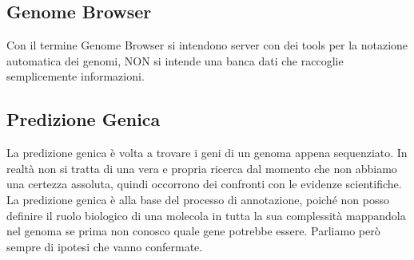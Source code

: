 \documentclass{article}
\begin{document}
\subsection*{Genome Browser}
Con il termine Genome Browser si intendono server con dei tools per la notazione automatica dei genomi, NON si intende una banca dati che raccoglie semplicemente informazioni.

\subsection*{Predizione Genica}
La predizione genica è volta a trovare i geni di un genoma appena sequenziato. In realtà non si tratta di una vera e propria ricerca dal momento che non abbiamo una certezza assoluta, quindi occorrono dei confronti con le evidenze scientifiche.\\
La predizione genica è alla base del processo di annotazione, poiché non posso definire il ruolo biologico di una molecola in tutta la sua complessità mappandola nel genoma se prima non conosco quale gene potrebbe essere. Parliamo però sempre di ipotesi che vanno confermate.
\end{document}
